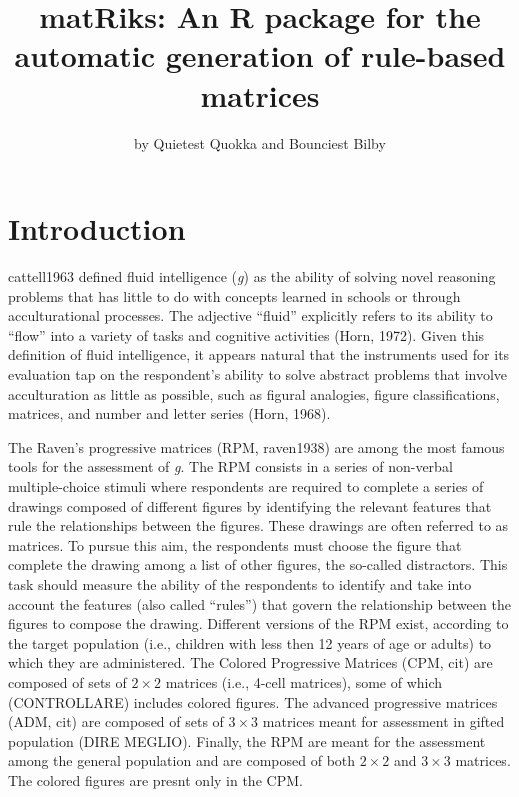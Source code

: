 \title{matRiks: An R package for the automatic generation of rule-based matrices}


\author{by Quietest Quokka and Bounciest Bilby}

\maketitle


\section{Introduction}\label{introduction}

cattell1963 defined fluid intelligence (\emph{g}) as the ability of solving novel reasoning problems that has little to do with concepts learned in schools or through acculturational processes.
The adjective ``fluid'' explicitly refers to its ability to ``flow'' into a variety of tasks and cognitive activities (Horn, 1972).
Given this definition of fluid intelligence, it appears natural that the instruments used for its evaluation tap on the respondent's ability to solve abstract problems that involve acculturation as little as possible, such as figural analogies, figure classifications, matrices, and number and letter series (Horn, 1968).

The Raven's progressive matrices (RPM, raven1938) are among the most famous tools for the assessment of \emph{g}.
The RPM consists in a series of non-verbal multiple-choice stimuli where respondents are required to complete a series of drawings composed of different figures by identifying the relevant features that rule the relationships between the figures.
These drawings are often referred to as matrices.
To pursue this aim, the respondents must choose the figure that complete the drawing among a list of other figures, the so-called distractors.
This task should measure the ability of the respondents to identify and take into account the features (also called ``rules'') that govern the relationship between the figures to compose the drawing.
Different versions of the RPM exist, according to the target population (i.e., children with less then 12 years of age or adults) to which they are administered.
The Colored Progressive Matrices (CPM, cit) are composed of sets of \(2\times2\) matrices (i.e., 4-cell matrices), some of which (CONTROLLARE) includes colored figures.
The advanced progressive matrices (ADM, cit) are composed of sets of \(3\times3\) matrices meant for assessment in gifted population (DIRE MEGLIO).
Finally, the RPM are meant for the assessment among the general population and are composed of both \(2\times2\) and \(3\times3\) matrices.
The colored figures are presnt only in the CPM.

